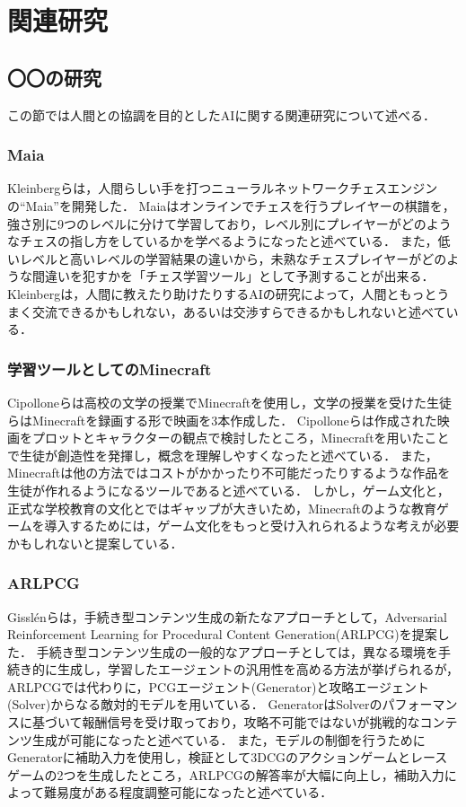 \chapter{関連研究}	%
\thispagestyle{plain}   %


\section{〇〇の研究}
この節では人間との協調を目的としたAIに関する関連研究について述べる．

\subsection{Maia}
Kleinbergらは，人間らしい手を打つニューラルネットワークチェスエンジンの“Maia”を開発した．
Maiaはオンラインでチェスを行うプレイヤーの棋譜を，強さ別に9つのレベルに分けて学習しており，レベル別にプレイヤーがどのようなチェスの指し方をしているかを学べるようになったと述べている．
また，低いレベルと高いレベルの学習結果の違いから，未熟なチェスプレイヤーがどのような間違いを犯すかを「チェス学習ツール」として予測することが出来る．
Kleinbergは，人間に教えたり助けたりするAIの研究によって，人間ともっとうまく交流できるかもしれない，あるいは交渉すらできるかもしれないと述べている．

\subsection{学習ツールとしてのMinecraft}
Cipolloneらは高校の文学の授業でMinecraftを使用し，文学の授業を受けた生徒らはMinecraftを録画する形で映画を3本作成した．
Cipolloneらは作成された映画をプロットとキャラクターの観点で検討したところ，Minecraftを用いたことで生徒が創造性を発揮し，概念を理解しやすくなったと述べている．
また，Minecraftは他の方法ではコストがかかったり不可能だったりするような作品を生徒が作れるようになるツールであると述べている．
しかし，ゲーム文化と，正式な学校教育の文化とではギャップが大きいため，Minecraftのような教育ゲームを導入するためには，ゲーム文化をもっと受け入れられるような考えが必要かもしれないと提案している．

\subsection{ARLPCG}
Gisslénらは，手続き型コンテンツ生成の新たなアプローチとして，Adversarial Reinforcement Learning for Procedural Content Generation(ARLPCG)を提案した．
手続き型コンテンツ生成の一般的なアプローチとしては，異なる環境を手続き的に生成し，学習したエージェントの汎用性を高める方法が挙げられるが，ARLPCGでは代わりに，PCGエージェント(Generator)と攻略エージェント(Solver)からなる敵対的モデルを用いている．
GeneratorはSolverのパフォーマンスに基づいて報酬信号を受け取っており，攻略不可能ではないが挑戦的なコンテンツ生成が可能になったと述べている．
また，モデルの制御を行うためにGeneratorに補助入力を使用し，検証として3DCGのアクションゲームとレースゲームの2つを生成したところ，ARLPCGの解答率が大幅に向上し，補助入力によって難易度がある程度調整可能になったと述べている．

